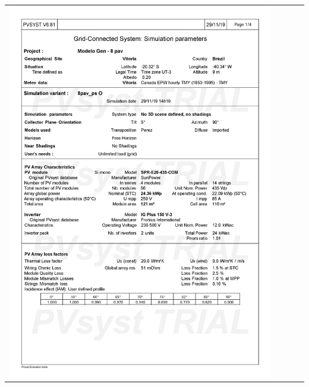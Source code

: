 \begin{table}[H]
    \centering
    \begin{tabular}{l}
        \includegraphics[width=0.9\textwidth]{figures/attachments/resultpv19.jpg}
    \end{tabular}
\end{table}
\pagebreak
